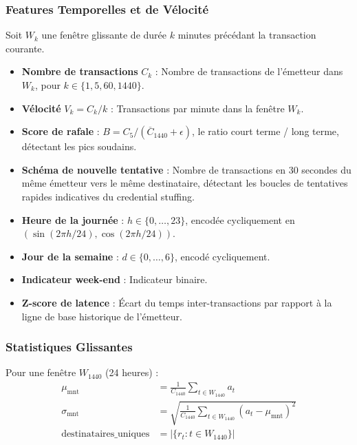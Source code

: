 \documentclass[12pt,a4paper,oneside]{book}
\theoremstyle{definition}
\theoremstyle{plain}
\begin{document}
\subsubsection{Features Temporelles et de Vélocité}

Soit $W_k$ une fenêtre glissante de durée $k$ minutes précédant la transaction courante.

\begin{itemize}
  \item \textbf{Nombre de transactions} $C_k$ : Nombre de transactions de l'émetteur dans $W_k$, pour $k \in \{1, 5, 60, 1440\}$.
  \item \textbf{Vélocité} $V_k = C_k / k$ : Transactions par minute dans la fenêtre $W_k$.
  \item \textbf{Score de rafale} : $B = C_5 / (\overline{C}_{1440} + \epsilon)$, le ratio court terme / long terme, détectant les pics soudains.
  \item \textbf{Schéma de nouvelle tentative} : Nombre de transactions en 30 secondes du même émetteur vers le même destinataire, détectant les boucles de tentatives rapides indicatives du credential stuffing.
  \item \textbf{Heure de la journée} : $h \in \{0, \ldots, 23\}$, encodée cycliquement en $(\sin(2\pi h/24), \cos(2\pi h/24))$.
  \item \textbf{Jour de la semaine} : $d \in \{0, \ldots, 6\}$, encodé cycliquement.
  \item \textbf{Indicateur week-end} : Indicateur binaire.
  \item \textbf{Z-score de latence} : Écart du temps inter-transactions par rapport à la ligne de base historique de l'émetteur.
\end{itemize}

\subsubsection{Statistiques Glissantes}

Pour une fenêtre $W_{1440}$ (24 heures) :
\begin{align}
  \mu_{\text{mnt}} &= \frac{1}{C_{1440}} \sum_{t \in W_{1440}} a_t \label{eq:rolling_mean} \\
  \sigma_{\text{mnt}} &= \sqrt{\frac{1}{C_{1440}} \sum_{t \in W_{1440}} (a_t - \mu_{\text{mnt}})^2} \label{eq:rolling_std} \\
  \text{destinataires\_uniques} &= \left|\{r_t : t \in W_{1440}\}\right| \label{eq:uniq_recv}
\end{align}
\end{document}
